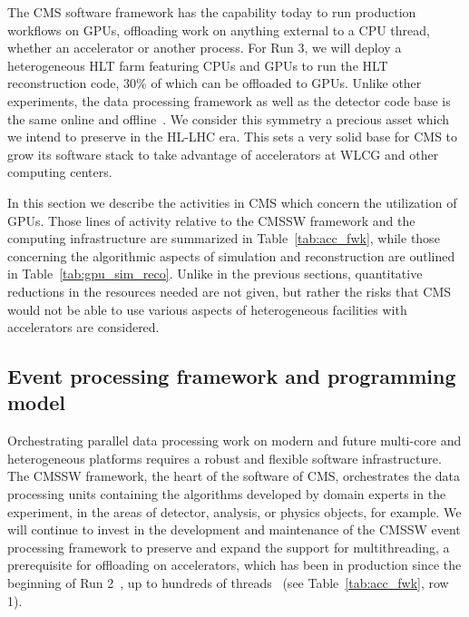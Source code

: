 \documentclass{cmspaper}
\begin{document}
The CMS software framework has the capability today to run production workflows on GPUs, offloading work on anything external to a CPU thread, whether an accelerator or another process. 
For Run 3, we will deploy a heterogeneous HLT farm featuring CPUs and GPUs to run the HLT reconstruction code, 30\% of which can be offloaded to GPUs. Unlike other experiments, the data processing framework as well as the detector code base is the same online and offline~\cite{Aaij:2704717}. We consider this symmetry a precious asset which we intend to preserve in the HL-LHC era.
This sets a very solid base for CMS to grow its software stack to take advantage of accelerators at WLCG and other computing centers.

In this section we describe the activities in CMS which concern the utilization of GPUs. Those lines of activity relative to the CMSSW framework and the computing infrastructure are summarized in Table~\ref{tab:acc_fwk}, while those concerning the algorithmic aspects of simulation and reconstruction are outlined in Table~\ref{tab:gpu_sim_reco}. Unlike in the previous sections, quantitative reductions in the resources needed are not given, but rather the risks that CMS would not be able to use various aspects of heterogeneous facilities with accelerators are considered.

\subsection{Event processing framework and programming model}

Orchestrating parallel data processing work on modern and future multi-core and heterogeneous platforms requires a robust and flexible software infrastructure. The CMSSW framework, the heart of the software of CMS, orchestrates the data processing units containing the algorithms developed by domain experts in the experiment, in the areas of detector, analysis, or physics objects, for example. We will continue to invest in the development and maintenance of the CMSSW event processing framework to preserve and expand the support for multithreading, a prerequisite for offloading on accelerators, which has been in production since the beginning of Run 2~\cite{Jones_2014, Jones_2015}, up to hundreds of threads~\cite{tbuffermerge} (see Table~\ref{tab:acc_fwk}, row 1).
\end{document}
